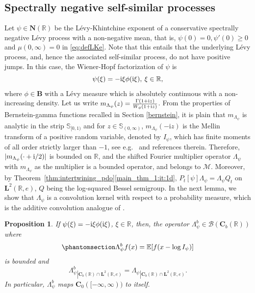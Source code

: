 \documentclass[12pt]{amsart}
\newcommand{\hlabel}{\phantomsection\label}
\newcommand{\hptg}[2]{\hypertarget{#1}{#2}}
\numberwithin{equation}{section}
\newcommand{\bb}{\mathbb}
\renewcommand{\geq}{\geqslant}
\newcommand{\bmrm}[2][2]{\mathbf{#2}^{#1}}
\newcommand{\C}{\mathbf{C}}
\newcommand{\B}{\mathbf{B}}
\renewcommand{\i}{\mathrm{i}}
\newtheorem{prop}[thm]{Proposition}
\theoremstyle{definition}
\theoremstyle{assump}
\theoremstyle{remark}
\begin{document}
{\subsection{Spectrally negative self-similar processes}\hlabel{ex:spectrally_neg}
Let $\psi\in\mathbf{N}(\bb{R})$ be the L\'evy-Khintchine exponent of a conservative spectrally negative L\'evy process with a non-negative mean, that is, $\psi(0)=0, \psi'(0)\geq0$ and  $\mu(0,\infty)=0$ in \eqref{eq:defLKe}. Note that this entails that the underlying L\'evy process, and, hence the associated self-similar process,  do not have  positive jumps. In this case, the Wiener-Hopf factorization of $\psi$ is \[\psi(\xi)=-{\rm{i}}\xi   \phi({\rm{i}}\xi   ), \: \xi\in\bb{R}, \] where $ \phi\in\B$ with a L\'evy measure which is absolutely continuous with a non-increasing density. Let us write $m_{\Lambda_\psi}(z)=\frac{\Gamma(1+{\rm{i}}z)   }{W_{\phi}(1+{\rm{i}}z)   }$. \hptg{C84}{From the properties of Bernstein-gamma functions recalled in Section \ref{bernstein}, it is plain that $m_{\Lambda_\psi}$ is analytic in the strip $\bb{S}_{[0,1)}$ and for $z\in\bb{S}_{(0,\infty)}$, $m_{\Lambda_\psi}(-\i z)$ is the Mellin transform of a positive random variable, denoted by $I_\psi$,  which has finite moments of all order strictly larger than $-1$, see e.g.~\cite{Patr} and references therein}. \hptg{C85}{Therefore, $|m_{\Lambda_\psi}(\cdot+{\rm{i}}/2)|$ is bounded on $\bb{R}$, and the shifted Fourier multiplier operator $\Lambda_\psi$ with $m_{\Lambda_\psi}$ as the multiplier is a bounded operator, and belongs to $\mathscr{M}$.}  Moreover, by  Theorem~\ref{thm:intertwining_pdo}\eqref{main_thm_1:it:1d}, $P_t[\psi]\Lambda_\psi=\Lambda_\psi Q_t$ on $\bmrm{L}(\bb{R},e)$, $Q$ being the log-squared Bessel semigroup. In the next lemma, we show that $\Lambda_\psi$ is a convolution kernel with respect to a probability measure, which is the additive convolution analogue of  \cite[Theorem 7.1]{patiesavov}.
\begin{prop}\hlabel{C0_intertwining}
If $\psi(\xi)=-{\rm{i}}\xi   \phi({\rm{i}}\xi   )$, $\xi\in\bb{R}$, then, the operator  $\Lambda^b_\psi \in \mathscr{B}(\C_b(\bb{R}))$ where
\begin{align}\hlabel{eq:Lambda_psi}
\Lambda^b_\psi f(x)=\bb{E}[f(x-\log I_\psi)]
\end{align}
 is bounded and
\[\Lambda^b_\psi {}_{\left. \right|{\C_b(\bb{R})\cap\bmrm{L}(\bb{R},e)}}=\Lambda_\psi {}_{\left.\right|{\C_b(\bb{R})\cap\bmrm{L}(\bb{R},e)}}.\]
In particular, $\Lambda^b_\psi$ maps $\C_0([-\infty,\infty))$ to itself.
\end{prop}
}
\end{document}
